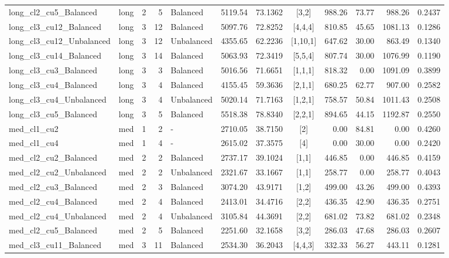 \documentclass[trsc,dblanonrev]{informs4}
\begin{document}
\begin{APPENDICES}
\begin{table}
{{\begin{tabular}{@{}l l r r l r r c r r r r@{}}
long\_cl2\_cu5\_Balanced & long & 2 & 5 & Balanced & 5119.54 & 73.1362 & [3,2] & 988.26 & 73.77 & 988.26 & 0.2437 \\
long\_cl3\_cu12\_Balanced & long & 3 & 12 & Balanced & 5097.76 & 72.8252 & [4,4,4] & 810.85 & 45.65 & 1081.13 & 0.1286 \\
long\_cl3\_cu12\_Unbalanced & long & 3 & 12 & Unbalanced & 4355.65 & 62.2236 & [1,10,1] & 647.62 & 30.00 & 863.49 & 0.1340 \\
long\_cl3\_cu14\_Balanced & long & 3 & 14 & Balanced & 5063.93 & 72.3419 & [5,5,4] & 807.74 & 30.00 & 1076.99 & 0.1190 \\
long\_cl3\_cu3\_Balanced & long & 3 & 3 & Balanced & 5016.56 & 71.6651 & [1,1,1] & 818.32 & 0.00 & 1091.09 & 0.3899 \\
long\_cl3\_cu4\_Balanced & long & 3 & 4 & Balanced & 4155.45 & 59.3636 & [2,1,1] & 680.25 & 62.77 & 907.00 & 0.2582 \\
long\_cl3\_cu4\_Unbalanced & long & 3 & 4 & Unbalanced & 5020.14 & 71.7163 & [1,2,1] & 758.57 & 50.84 & 1011.43 & 0.2508 \\
long\_cl3\_cu5\_Balanced & long & 3 & 5 & Balanced & 5518.38 & 78.8340 & [2,2,1] & 894.65 & 44.15 & 1192.87 & 0.2550 \\
med\_cl1\_cu2 & med & 1 & 2 & - & 2710.05 & 38.7150 & [2] & 0.00 & 84.81 & 0.00 & 0.4260 \\
med\_cl1\_cu4 & med & 1 & 4 & - & 2615.02 & 37.3575 & [4] & 0.00 & 30.00 & 0.00 & 0.2420 \\
med\_cl2\_cu2\_Balanced & med & 2 & 2 & Balanced & 2737.17 & 39.1024 & [1,1] & 446.85 & 0.00 & 446.85 & 0.4159 \\
med\_cl2\_cu2\_Unbalanced & med & 2 & 2 & Unbalanced & 2321.67 & 33.1667 & [1,1] & 258.77 & 0.00 & 258.77 & 0.4043 \\
med\_cl2\_cu3\_Balanced & med & 2 & 3 & Balanced & 3074.20 & 43.9171 & [1,2] & 499.00 & 43.26 & 499.00 & 0.4393 \\
med\_cl2\_cu4\_Balanced & med & 2 & 4 & Balanced & 2413.01 & 34.4716 & [2,2] & 436.35 & 42.90 & 436.35 & 0.2751 \\
med\_cl2\_cu4\_Unbalanced & med & 2 & 4 & Unbalanced & 3105.84 & 44.3691 & [2,2] & 681.02 & 73.82 & 681.02 & 0.2348 \\
med\_cl2\_cu5\_Balanced & med & 2 & 5 & Balanced & 2251.60 & 32.1658 & [3,2] & 286.03 & 47.68 & 286.03 & 0.2607 \\
med\_cl3\_cu11\_Balanced & med & 3 & 11 & Balanced & 2534.30 & 36.2043 & [4,4,3] & 332.33 & 56.27 & 443.11 & 0.1281 \\

\end{tabular}}}
\end{table}
\end{APPENDICES}
\end{document}
